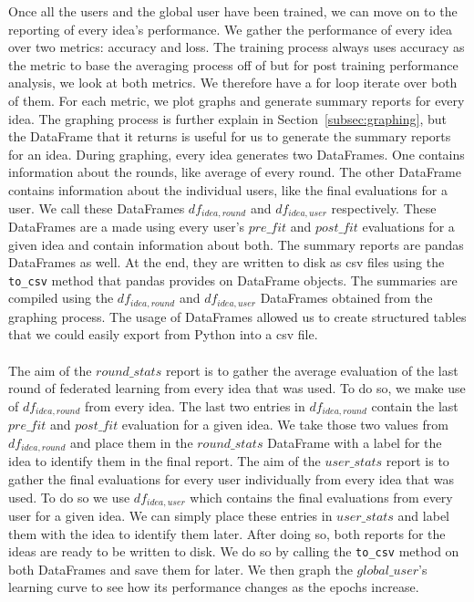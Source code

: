 \documentclass[12pt]{article}
\begin{document}
Once all the users and the global user have been trained, we can move on to the reporting of every idea's performance. We gather the performance of every idea over two metrics: accuracy and loss. The training process always uses accuracy as the metric to base the averaging process off of but for post training performance analysis, we look at both metrics. We therefore have a for loop iterate over both of them. For each metric, we plot graphs and generate summary reports for every idea. The graphing process is further explain in Section~\ref{subsec:graphing}, but the DataFrame that it returns is useful for us to generate the summary reports for an idea. During graphing, every idea generates two DataFrames. One contains information about the rounds, like average of every round. The other DataFrame contains information about the individual users, like the final evaluations for a user. We call these DataFrames $df_{idea, round}$ and $df_{idea, user}$ respectively. These DataFrames are a made using every user's $pre\_fit$ and $post\_fit$ evaluations for a given idea and contain information about both. The summary reports are pandas DataFrames as well. At the end, they are written to disk as csv files using the \texttt{to\_csv} method that pandas provides on DataFrame objects. The summaries are compiled using the $df_{idea, round}$ and $df_{idea, user}$ DataFrames obtained from the graphing process. The usage of DataFrames allowed us to create structured tables that we could easily export from Python into a csv file. 
\\\\
The aim of the $round\_stats$ report is to gather the average evaluation of the last round of federated learning from every idea that was used. To do so, we make use of $df_{idea, round}$ from every idea. The last two entries in $df_{idea, round}$ contain the last $pre\_fit$ and $post\_fit$ evaluation for a given idea. We take those two values from $df_{idea, round}$ and place them in the $round\_stats$ DataFrame with a label for the idea to identify them in the final report. The aim of the $user\_stats$ report is to gather the final evaluations for every user individually from every idea that was used. To do so we use $df_{idea, user}$ which contains the final evaluations from every user for a given idea. We can simply place these entries in $user\_stats$ and label them with the idea to identify them later. After doing so, both reports for the ideas are ready to be written to disk. We do so by calling the \texttt{to\_csv} method on both DataFrames and save them for later. We then graph the $global\_user$'s learning curve to see how its performance changes as the epochs increase. 
\end{document}
